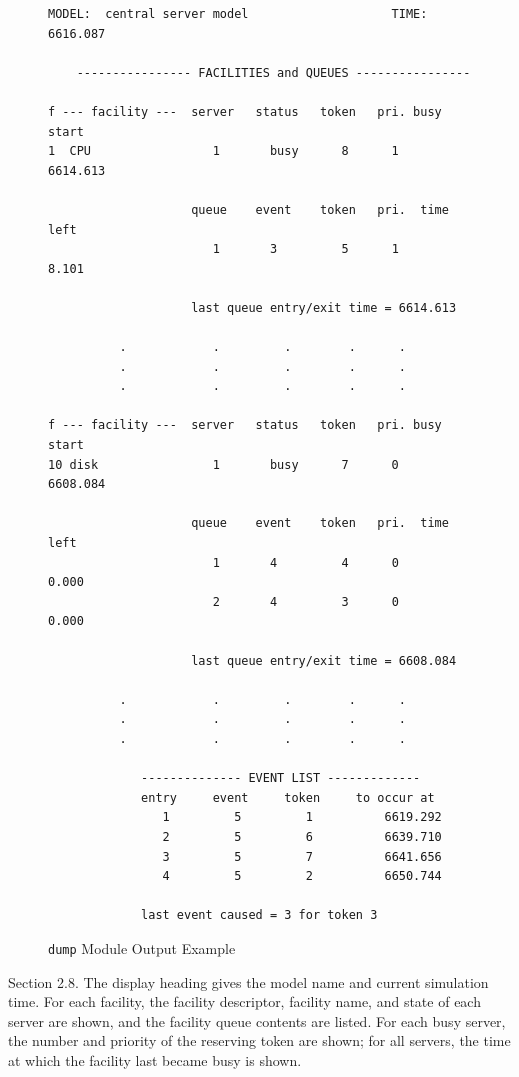 \begin{figure}[H]
\centering
\begin{minipage}{\textwidth}
\scriptsize
\begin{verbatim}
MODEL:  central server model                    TIME:    6616.087

    ---------------- FACILITIES and QUEUES ----------------

f --- facility ---  server   status   token   pri. busy start
1  CPU                 1       busy      8      1     6614.613

                    queue    event    token   pri.  time left
                       1       3         5      1        8.101

                    last queue entry/exit time = 6614.613

          .            .         .        .      .
          .            .         .        .      .
          .            .         .        .      .

f --- facility ---  server   status   token   pri. busy start
10 disk                1       busy      7      0     6608.084

                    queue    event    token   pri.  time left
                       1       4         4      0        0.000
                       2       4         3      0        0.000

                    last queue entry/exit time = 6608.084

          .            .         .        .      .
          .            .         .        .      .
          .            .         .        .      .

             -------------- EVENT LIST -------------
             entry     event     token     to occur at
                1         5         1          6619.292
                2         5         6          6639.710
                3         5         7          6641.656
                4         5         2          6650.744

             last event caused = 3 for token 3
\end{verbatim}
\end{minipage}
\caption{\texttt{dump} Module Output Example}
\label{fig:smpl-dump-example}
\end{figure}


\noindent Section 2.8. The display heading gives the model name and current simulation
time. For each facility, the facility descriptor, facility name, and
state of each server are shown, and the facility queue contents are listed. For
each busy server, the number and priority of the reserving token are shown;
for all servers, the time at which the facility last became busy is shown.

